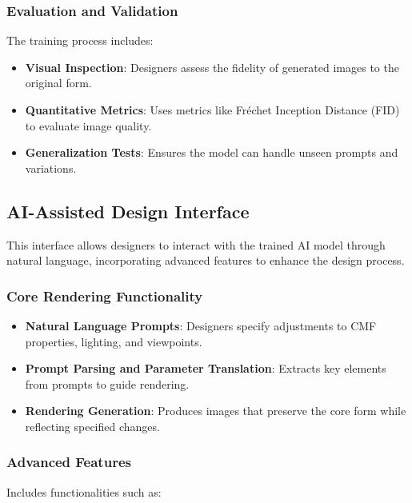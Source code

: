 \documentclass{article}
\begin{document}
\subsubsection{Evaluation and Validation}

The training process includes:

\begin{itemize}
    \item \textbf{Visual Inspection}: Designers assess the fidelity of generated images to the original form.
    \item \textbf{Quantitative Metrics}: Uses metrics like Fréchet Inception Distance (FID) to evaluate image quality.
    \item \textbf{Generalization Tests}: Ensures the model can handle unseen prompts and variations.
\end{itemize}

\subsection{AI-Assisted Design Interface}

This interface allows designers to interact with the trained AI model through natural language, incorporating advanced features to enhance the design process.

\subsubsection{Core Rendering Functionality}

\begin{itemize}
    \item \textbf{Natural Language Prompts}: Designers specify adjustments to CMF properties, lighting, and viewpoints.
    \item \textbf{Prompt Parsing and Parameter Translation}: Extracts key elements from prompts to guide rendering.
    \item \textbf{Rendering Generation}: Produces images that preserve the core form while reflecting specified changes.
\end{itemize}

\subsubsection{Advanced Features}

Includes functionalities such as:
\end{document}
